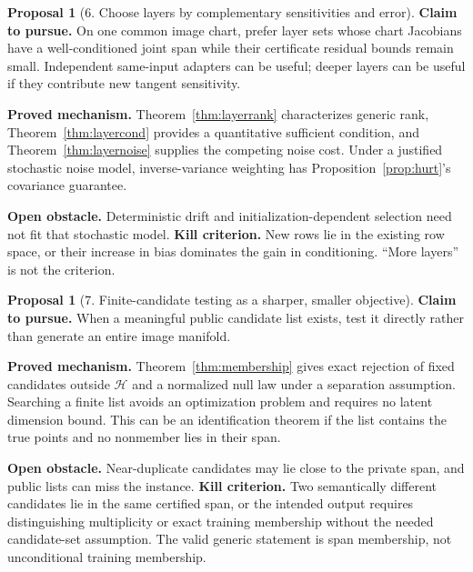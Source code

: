 \documentclass[11pt,a4paper]{article}
\theoremstyle{definition}
\theoremstyle{definition}
\newtheorem{proposal}[theorem]{Proposal}
\theoremstyle{remark}\newtheorem{remark}[theorem]{Remark}
\newcommand{\HH}{\mathcal H}\newcommand{\XX}{\mathcal X}\newcommand{\col}{\operatorname{col}}
\begin{document}
\begin{proposal}[6. Choose layers by complementary sensitivities and error]
\textbf{Claim to pursue.} On one common image chart, prefer layer sets whose chart Jacobians have a well-conditioned joint span while their certificate residual bounds remain small. Independent same-input adapters can be useful; deeper layers can be useful if they contribute new tangent sensitivity.

\textbf{Proved mechanism.} Theorem~\ref{thm:layerrank} characterizes generic rank, Theorem~\ref{thm:layercond} provides a quantitative sufficient condition, and Theorem~\ref{thm:layernoise} supplies the competing noise cost. Under a justified stochastic noise model, inverse-variance weighting has Proposition~\ref{prop:hurt}'s covariance guarantee.

\textbf{Open obstacle.} Deterministic drift and initialization-dependent selection need not fit that stochastic model. \textbf{Kill criterion.} New rows lie in the existing row space, or their increase in bias dominates the gain in conditioning. ``More layers'' is not the criterion.
\end{proposal}

\begin{proposal}[7. Finite-candidate testing as a sharper, smaller objective]
\textbf{Claim to pursue.} When a meaningful public candidate list exists, test it directly rather than generate an entire image manifold.

\textbf{Proved mechanism.} Theorem~\ref{thm:membership} gives exact rejection of fixed candidates outside $\HH$ and a normalized null law under a separation assumption. Searching a finite list avoids an optimization problem and requires no latent dimension bound. This can be an identification theorem if the list contains the true points and no nonmember lies in their span.

\textbf{Open obstacle.} Near-duplicate candidates may lie close to the private span, and public lists can miss the instance. \textbf{Kill criterion.} Two semantically different candidates lie in the same certified span, or the intended output requires distinguishing multiplicity or exact training membership without the needed candidate-set assumption. The valid generic statement is span membership, not unconditional training membership.
\end{proposal}
\end{document}
